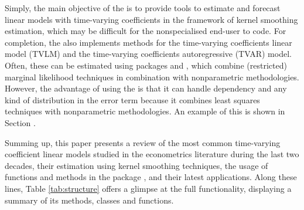 Simply, the main objective of the  is to provide tools to estimate and forecast linear models with time-varying coefficients in the framework of kernel smoothing estimation, which may be difficult for the nonspecialised end-user to code. For completion, the  also implements methods for the time-varying coefficients linear model (TVLM) and the time-varying coefficients autoregressive (TVAR) model. Often, these can be estimated using packages  \citep{Gam2022} and  \citep{Wood2017}, which combine (restricted) marginal likelihood techniques in combination with nonparametric methodologies. However, the advantage of using the  is that it can handle dependency and any kind of distribution in the error term because it combines least squares techniques with nonparametric methodologies. An example of this is shown in Section .

Summing up, this paper presents a review of the most common time-varying coefficient linear models studied in the econometrics literature during the last two decades, their estimation using kernel smoothing techniques, the usage of functions and methods in the package , and their latest applications. Along these lines, Table \ref{tab:structure} offers a glimpse at the  full functionality, displaying a summary of its methods, classes and functions. 

